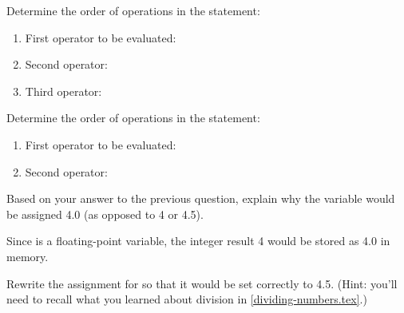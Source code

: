 \newpage

\Q Determine the order of operations in the statement: ~ 

\begin{enumerate}[itemsep=2pt]
\item First operator to be evaluated: \ans[3em]{\java{-}}
\item Second operator: \ans[3em]{\java{*}}
\item Third operator: \ans[3em]{\java{=}}
\end{enumerate}


\Q Determine the order of operations in the statement: ~ 

\begin{enumerate}[itemsep=2pt]
\item First operator to be evaluated: \ans[3em]{\java{/}}
\item Second operator: \ans[3em]{\java{=}}
\end{enumerate}


\Q \label{key3}
Based on your answer to the previous question, explain why the variable  would be assigned 4.0 (as opposed to 4 or 4.5).

\begin{answer}
Since  is a floating-point variable, the integer result 4 would be stored as 4.0 in memory.
\end{answer}


\Q Rewrite the assignment for  so that it would be set correctly to 4.5. (Hint: you'll need to recall what you learned about division in \ref{dividing-numbers.tex}.)

\begin{answer}
\end{answer}
